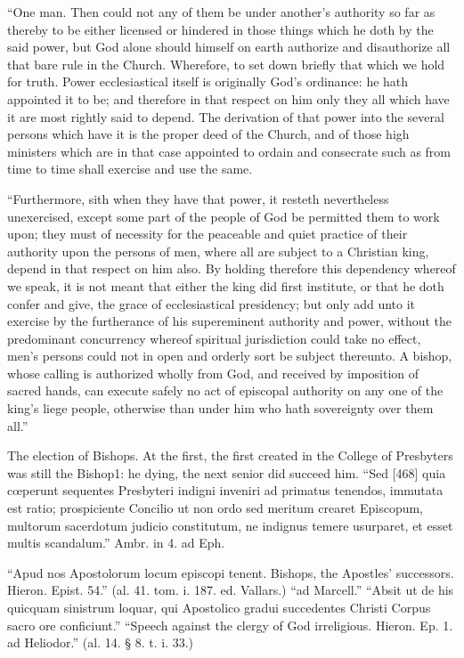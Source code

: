 “One man. Then could not any of them be under another’s authority so far as thereby to be either licensed or hindered in those things which he doth by the said power, but God alone should himself on earth authorize and disauthorize all that bare rule in the Church. Wherefore, to set down briefly that which we hold for truth. Power ecclesiastical itself is originally God’s ordinance: he hath appointed it to be; and therefore in that respect on him only they all which have it are most rightly said to depend. The derivation of that power into the several persons which have it is the proper deed of the Church, and of those high ministers which are in that case appointed to ordain and consecrate such as from time to time shall exercise and use the same.

“Furthermore, sith when they have that power, it resteth nevertheless unexercised, except some part of the people of God be permitted them to work upon; they must of necessity for the peaceable and quiet practice of their authority upon the persons of men, where all are subject to a Christian king, depend in that respect on him also. By holding therefore this dependency whereof we speak, it is not meant that either the king did first institute, or that he doth confer and give, the grace of ecclesiastical presidency; but only add unto it exercise by the furtherance of his supereminent authority and power, without the predominant concurrency whereof spiritual jurisdiction could take no effect, men’s persons could not in open and orderly sort be subject thereunto. A bishop, whose calling is authorized wholly from God, and received by imposition of sacred hands, can execute safely no act of episcopal authority on any one of the king’s liege people, otherwise than under him who hath sovereignty over them all.”

The election of Bishops.
At the first, the first created in the College of Presbyters was still the Bishop1: he dying, the next senior did succeed him. “Sed [468] quia cœperunt sequentes Presbyteri indigni inveniri ad primatus tenendos, immutata est ratio; prospiciente Concilio ut non ordo sed meritum crearet Episcopum, multorum sacerdotum judicio constitutum, ne indignus temere usurparet, et esset multis scandalum.” Ambr. in 4. ad Eph.

“Apud nos Apostolorum locum episcopi tenent. Bishops, the Apostles’ successors. Hieron. Epist. 54.” (al. 41. tom. i. 187. ed. Vallars.) “ad Marcell.” “Absit ut de his quicquam sinistrum loquar, qui Apostolico gradui succedentes Christi Corpus sacro ore conficiunt.” “Speech against the clergy of God irreligious. Hieron. Ep. 1. ad Heliodor.” (al. 14. § 8. t. i. 33.)

